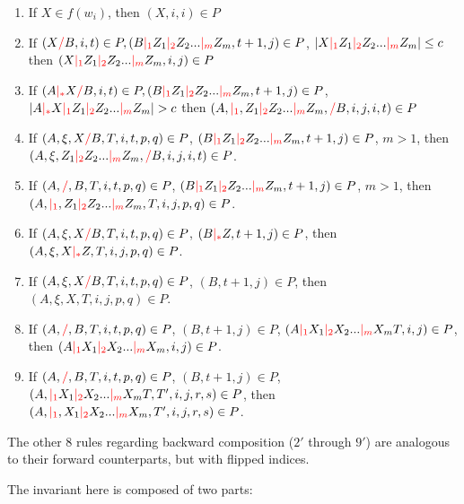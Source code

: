 \documentclass[main.tex]{subfiles}
\begin{document}
\begin{enumerate}
    \item If $X \in f(w_i)$, then $(X, i, i) \in P$
    \item If $(X \textcolor{red}{/} B, i, t) \in P, (B \textcolor{red}{|_{1}} Z_1 \textcolor{red}{|_{2}} Z_2 ... \textcolor{red}{|_{m}} Z_m, t + 1, j) \in P$,
        $|X \textcolor{red}{|_{1}} Z_1 \textcolor{red}{|_{2}} Z_2 ... \textcolor{red}{|_{m}} Z_m| \leq c$
        then $(X \textcolor{red}{|_{1}} Z_1 \textcolor{red}{|_{2}} Z_2 ... \textcolor{red}{|_{m}} Z_m, i, j) \in P$
    \item If $(A \textcolor{red}{|_{*}} X \textcolor{red}{/} B, i, t) \in P, (B \textcolor{red}{|_{1}} Z_1 \textcolor{red}{|_{2}} Z_2 ... \textcolor{red}{|_{m}} Z_m, t + 1, j) \in P$,
        $|A \textcolor{red}{|_{*}} X \textcolor{red}{|_{1}} Z_1 \textcolor{red}{|_{2}} Z_2 ... \textcolor{red}{|_{m}} Z_m| > c$
        then $(A, \textcolor{red}{|_{1}}, Z_1 \textcolor{red}{|_{2}} Z_2 ... \textcolor{red}{|_{m}} Z_m, \textcolor{red}{/} B, i, j, i, t) \in P$
    \item If $(A, \xi, X \textcolor{red}{/} B, T, i, t, p, q) \in P$,
        $(B \textcolor{red}{|_{1}} Z_1 \textcolor{red}{|_{2}} Z_2 ... \textcolor{red}{|_{m}} Z_m, t + 1, j) \in P$,
        $m > 1$, then $(A, \xi, Z_1 \textcolor{red}{|_{2}} Z_2 ... \textcolor{red}{|_{m}} Z_m, \textcolor{red}{/} B, i, j, i, t) \in P$.
    \item If $(A, \textcolor{red}{/}, B, T, i, t, p, q) \in P$,
        $(B \textcolor{red}{|_{1}} Z_1 \textcolor{red}{|_{2}} Z_2 ... \textcolor{red}{|_{m}} Z_m, t + 1, j) \in P$,
        $m > 1$, then $(A, \textcolor{red}{|_{1}}, Z_1 \textcolor{red}{|_{2}} Z_2 ... \textcolor{red}{|_{m}} Z_m, T, i, j, p, q) \in P$.
    \item If $(A, \xi, X \textcolor{red}{/} B, T, i, t, p, q) \in P$,
        $(B \textcolor{red}{|_{*}} Z, t + 1, j) \in P$,
        then $(A, \xi, X \textcolor{red}{|_{*}} Z, T, i, j, p, q) \in P$.
    \item If $(A, \xi, X \textcolor{red}{/} B, T, i, t, p, q) \in P$,
        $(B, t + 1, j) \in P$,
        then $(A, \xi, X, T, i, j, p, q) \in P$.
    \item If $(A, \textcolor{red}{/}, B, T, i, t, p, q) \in P$,
        $(B, t + 1, j) \in P$, $(A \textcolor{red}{|_{1}} X_1 \textcolor{red}{|_{2}} X_2 ... \textcolor{red}{|_{m}} X_m T, i, j) \in P$,
        then $(A \textcolor{red}{|_{1}} X_1 \textcolor{red}{|_{2}} X_2 ... \textcolor{red}{|_{m}} X_m, i, j) \in P$.
    \item If $(A, \textcolor{red}{/}, B, T, i, t, p, q) \in P$,
        $(B, t + 1, j) \in P$, $(A, \textcolor{red}{|_{1}} X_1 \textcolor{red}{|_{2}} X_2 ... \textcolor{red}{|_{m}} X_m T, T', i, j, r, s) \in P$,
        then $(A, \textcolor{red}{|_{1}}, X_1 \textcolor{red}{|_{2}} X_2 ... \textcolor{red}{|_{m}} X_m, T', i, j, r, s) \in P$.
\end{enumerate}

The other 8 rules regarding backward composition
($2'$ through $9'$) are analogous to their forward counterparts, but with
flipped indices.

The invariant here is composed of two parts:
\end{document}

